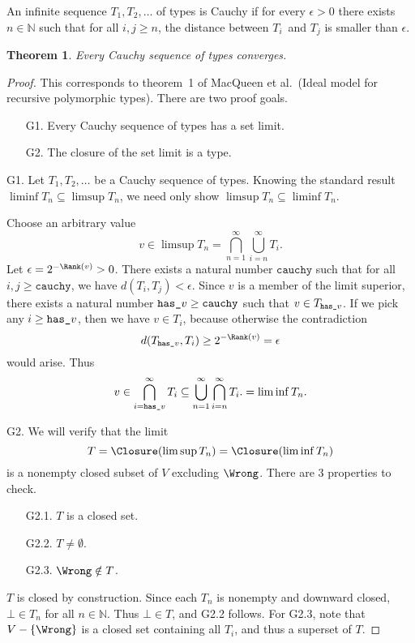 \documentclass{amsart}
\newtheorem{theorem}[subsection]{Theorem}
\theoremstyle{definition}
\begin{document}

An infinite sequence $T_1,T_2,\ldots$ of types is Cauchy if for
every $\epsilon>0$ there exists $n\in\mathbb N$ such that for all
$i,j\ge n$, the distance between $T_i$~and $T_j$ is smaller than
$\epsilon$.

\begin{theorem}\label{cauchy}
Every Cauchy sequence of types converges.
\end{theorem}

\begin{proof}
This corresponds to theorem~1 of MacQueen et al.\ (Ideal model
for recursive polymorphic types). There are two proof goals.
\begin{enumerate}
\item [G1.] Every Cauchy sequence of types has a set limit.
\item [G2.] The closure of the set limit is a type.
\end{enumerate}

G1. Let $T_1,T_2,\ldots$ be a Cauchy sequence of types. Knowing
the standard result $\liminf T_n\subseteq\limsup T_n$, we need
only show $\limsup T_n\subseteq\liminf T_n$.

\def\Cauchy{\texttt{cauchy}}
\def\Hasv{{\texttt{has\textunderscore}v}}

Choose an arbitrary value
\[
v\in \limsup T_n = \bigcap_{n=1}^\infty\bigcup_{i = n}^\infty T_i.
\]
Let $\epsilon=2^{-\Rank(v)}>0$. There exists a natural number
$\Cauchy$ such that for all $i,j\ge\Cauchy$, we have
$d(T_i,T_j)<\epsilon$. Since $v$ is a member of the limit
superior, there exists a natural number $\Hasv\ge\Cauchy$ such
that $v\in T_\Hasv$. If we pick any $i\ge\Hasv$, then we have
$v\in T_i$, because otherwise the contradiction
\[
d(T_\Hasv, T_i)\ge2^{-\Rank(v)}=\epsilon
\]
would arise. Thus
\[
v\in
\bigcap_{i=\Hasv}^\infty T_i\subseteq
\bigcup_{n=1}^\infty\bigcap_{i = n}^\infty T_i.
=\liminf T_n.
\]

G2. We will verify that the limit
\[
T=\Closure(\limsup T_n)=\Closure(\liminf T_n)
\]
is a nonempty closed subset of $V$ excluding $\Wrong$. There are
3 properties to check.
\begin{enumerate}
\item [G2.1.] $T$ is a closed set.
\item [G2.2.] $T\neq\emptyset$.
\item [G2.3.] $\Wrong\notin T$.
\end{enumerate}

$T$ is closed by construction. Since each $T_n$ is nonempty and
downward closed, $\bot\in T_n$ for all $n\in\mathbb N$. Thus
$\bot\in T$, and G2.2 follows. For G2.3, note that $V-\{\Wrong\}$
is a closed set containing all $T_i$, and thus a superset of $T$.
\end{proof}
\end{document}
